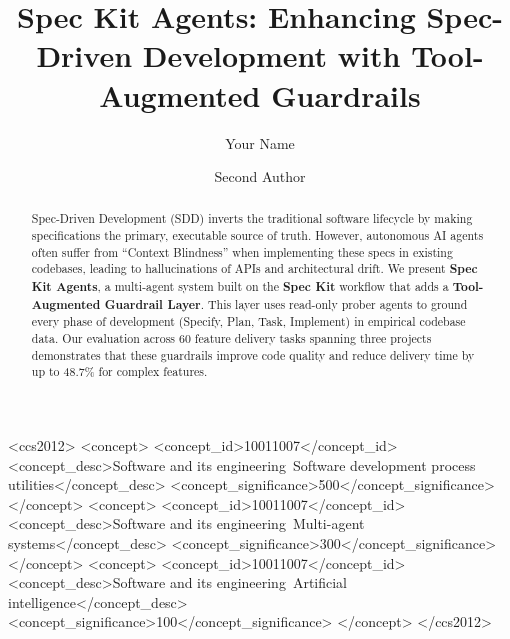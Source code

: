 \documentclass[sigconf,anonymous,review]{acmart}
\begin{document}
\title{Spec Kit Agents: Enhancing Spec-Driven Development with Tool-Augmented Guardrails}

\author{Your Name}

\author{Second Author}


\begin{abstract}
Spec-Driven Development (SDD) inverts the traditional software lifecycle by making specifications the primary, executable source of truth. However, autonomous AI agents often suffer from ``Context Blindness'' when implementing these specs in existing codebases, leading to hallucinations of APIs and architectural drift. We present \textbf{Spec Kit Agents}, a multi-agent system built on the \textbf{Spec Kit} workflow that adds a \textbf{Tool-Augmented Guardrail Layer}. This layer uses read-only prober agents to ground every phase of development (Specify, Plan, Task, Implement) in empirical codebase data. Our evaluation across 60 feature delivery tasks spanning three projects demonstrates that these guardrails improve code quality and reduce delivery time by up to 48.7\% for complex features.
\end{abstract}

\begin{CCSXML}
<ccs2012>
 <concept>
  <concept_id>10011007</concept_id>
  <concept_desc>Software and its engineering~Software development process utilities</concept_desc>
  <concept_significance>500</concept_significance>
 </concept>
 <concept>
  <concept_id>10011007</concept_id>
  <concept_desc>Software and its engineering~Multi-agent systems</concept_desc>
  <concept_significance>300</concept_significance>
 </concept>
 <concept>
  <concept_id>10011007</concept_id>
  <concept_desc>Software and its engineering~Artificial intelligence</concept_desc>
  <concept_significance>100</concept_significance>
 </concept>
</ccs2012>
\end{CCSXML}


\end{document}
